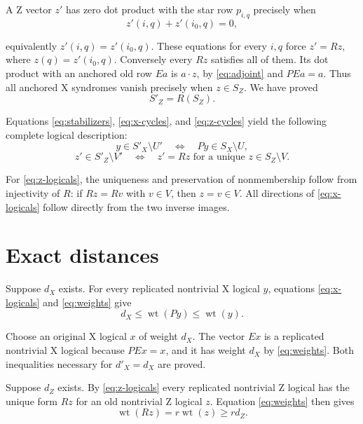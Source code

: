 \documentclass{article}
\DeclareMathOperator{\wt}{wt}
\begin{document}
A Z vector \(z'\) has zero dot product with the star row \(p_{i,q}\)
precisely when
\begin{equation}\label{eq:star-syndrome}
z'(i,q)+z'(i_0,q)=0,
\end{equation}

equivalently \(z'(i,q)=z'(i_0,q)\). These equations for every \(i,q\)
force \(z'=Rz\), where \(z(q)=z'(i_0,q)\). Conversely every \(Rz\)
satisfies all of them. Its dot product with an anchored old row \(Ea\)
is \(a\cdot z\), by \eqref{eq:adjoint} and \(PEa=a\). Thus all anchored X syndromes
vanish precisely when \(z\in S_Z\). We have proved
\begin{equation}\label{eq:z-cycles}
S'_Z=R(S_Z).
\end{equation}

Equations \eqref{eq:stabilizers}, \eqref{eq:x-cycles}, and \eqref{eq:z-cycles} yield the
following
complete logical description:
\begin{equation}\label{eq:x-logicals}
y\in S'_X\setminus U'
\quad\Longleftrightarrow\quad Py\in S_X\setminus U,
\end{equation}
\begin{equation}\label{eq:z-logicals}
z'\in S'_Z\setminus V'
\quad\Longleftrightarrow\quad
z'=Rz\text{ for a unique }z\in S_Z\setminus V.
\end{equation}

For \eqref{eq:z-logicals}, the uniqueness and preservation of nonmembership follow from
injectivity of \(R\): if \(Rz=Rv\) with \(v\in V\), then \(z=v\in V\).
All directions of \eqref{eq:x-logicals} follow directly from the two inverse images.

\section{Exact distances}\label{sec:distances}

Suppose \(d_X\) exists. For every replicated nontrivial X logical \(y\),
equations \eqref{eq:x-logicals} and \eqref{eq:weights} give
\begin{equation}\label{eq:x-lower}
d_X\le\wt(Py)\le\wt(y).
\end{equation}

Choose an original X logical \(x\) of weight \(d_X\). The vector \(Ex\)
is a replicated nontrivial X logical because \(PEx=x\), and it has weight
\(d_X\) by \eqref{eq:weights}. Both inequalities necessary for \(d'_X=d_X\) are proved.

Suppose \(d_Z\) exists. By \eqref{eq:z-logicals} every replicated nontrivial Z logical has
the unique form \(Rz\) for an old nontrivial Z logical \(z\). Equation \eqref{eq:weights}
then gives
\begin{equation}\label{eq:z-lower}
\wt(Rz)=r\wt(z)\ge r d_Z.
\end{equation}
\end{document}
